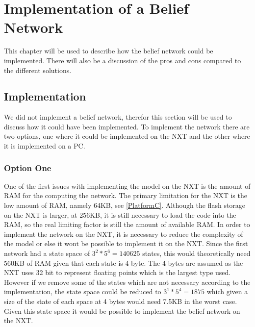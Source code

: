 \chapter{Implementation of a Belief Network}
This chapter will be used to describe how the belief network could be
implemented. There will also be a discussion of the pros and cons compared to
the different solutions.

\section{Implementation}
We did not implement a belief network, therefor this section will be used to
discuss how it could have been implemented. To implement the network there are
two options, one where it could be implemented on the NXT and the other where it is
implemented on a PC.

%

\subsection{Option One}
One of the first issues with implementing the model on the NXT is the amount of
RAM for the computing the network. The primary limitation for the NXT is the
low amount of RAM, namely 64KB, see \autoref{PlatformC}. Although the flash
storage on the NXT is larger, at 256KB, it is still necessary to load the code
into the RAM, so the real limiting factor is still the amount of available RAM.
In order to implement the network on the NXT, it is necessary to reduce the
complexity of the model or else it wont be possible to implement it on the NXT.
Since the first network had a state space of $3^2*5^6 = 140625$ states, this
would theoretically need 560KB of RAM given that each state is 4 byte. The 4
bytes are assumed as the NXT uses 32 bit to represent floating points which is
the largest type used. However if we remove some of the states which are not
necessary according to the implementation, the state space could be reduced to
$3^1*5^4 = 1875$ which given a size of the state of each space at 4 bytes would
need 7.5KB in the worst case. Given this state space it would be possible to
implement the belief network on the NXT.\nl


